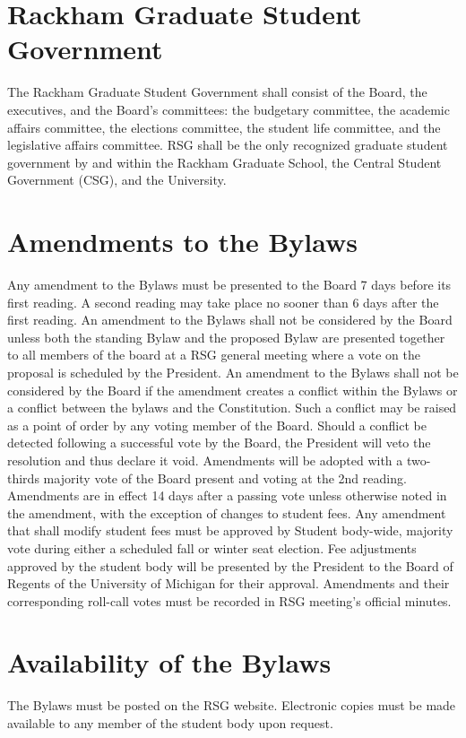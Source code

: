 \section{Rackham Graduate Student Government} The Rackham Graduate Student
Government shall consist of the Board, the executives, and the Board's 
committees: the budgetary committee, the academic affairs committee, the 
elections committee, the student life committee, and the legislative affairs 
committee. RSG shall be the only recognized graduate student government by and within the Rackham Graduate School, the Central Student Government (CSG), and the University. 

\section{Amendments to the Bylaws}
\begin{enumsubsection}
\itemnotoc Any amendment to the Bylaws must be presented to the Board 7 days 
before its first reading. A second reading may take place no sooner than 
6 days after the first reading. 
\itemnotoc An amendment to the Bylaws shall not be considered by the Board unless 
both the standing Bylaw and the proposed Bylaw are presented together  to all members of the board at a RSG general meeting where a 
vote on the proposal is scheduled by the President. 
\itemnotoc An amendment to the Bylaws shall not be considered by the Board if the 
amendment creates a conflict within the Bylaws or a conflict between the 
bylaws and the Constitution. Such a conflict may be raised as a point of 
order by any voting member of the Board. Should a conflict be detected 
following a successful vote by the Board, the President will veto the 
resolution and thus declare it void. 
\itemnotoc Amendments will be adopted with a two-thirds majority vote of the Board 
present and voting at the 2nd reading. Amendments are in effect 14 days 
after a passing vote unless otherwise noted in the amendment, with the 
exception of changes to student fees.
\itemnotoc Any amendment that shall modify student fees must be approved by 
Student body-wide, majority vote during either a scheduled fall or winter 
seat election. Fee adjustments approved by the student body will be presented by the President to the Board of Regents of the University of 
Michigan for their approval. Amendments and their corresponding roll-call votes must be recorded in RSG 
meeting's official minutes.
\end{enumsubsection}
\section{Availability of the Bylaws} The Bylaws must be posted on the RSG website.
Electronic copies must be made available to any member of the student body 
upon request.

